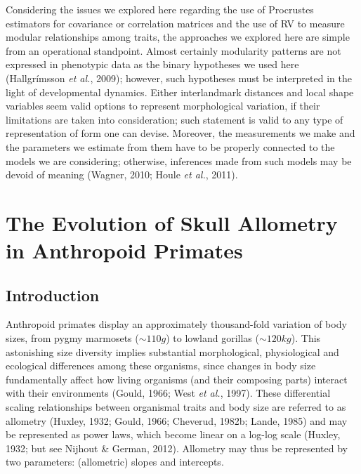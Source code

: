 \documentclass[12pt,twoside]{report}
\begin{document}
Considering the issues we explored here regarding the use of Procrustes
estimators for covariance or correlation matrices and the use of RV to
measure modular relationships among traits, the approaches we explored
here are simple from an operational standpoint. Almost certainly
modularity patterns are not expressed in phenotypic data as the binary
hypotheses we used here (Hallgrímsson \emph{et al.}, 2009); however,
such hypotheses must be interpreted in the light of developmental
dynamics. Either interlandmark distances and local shape variables seem
valid options to represent morphological variation, if their limitations
are taken into consideration; such statement is valid to any type of
representation of form one can devise. Moreover, the measurements we
make and the parameters we estimate from them have to be properly
connected to the models we are considering; otherwise, inferences made
from such models may be devoid of meaning (Wagner, 2010; Houle \emph{et
al.}, 2011).

\newpage
\chapter{The Evolution of Skull Allometry in Anthropoid Primates}
\label{ch:allo}

\section{Introduction}\label{introduction-1}

Anthropoid primates display an approximately thousand-fold variation of
body sizes, from pygmy marmosets ($\sim 110g$) to lowland gorillas
($\sim 120kg$). This astonishing size diversity implies substantial
morphological, physiological and ecological differences among these
organisms, since changes in body size fundamentally affect how living
organisms (and their composing parts) interact with their environments
(Gould, 1966; West \emph{et al.}, 1997). These differential scaling
relationships between organismal traits and body size are referred to as
allometry (Huxley, 1932; Gould, 1966; Cheverud, 1982b; Lande, 1985) and
may be represented as power laws, which become linear on a log-log scale
(Huxley, 1932; but see Nijhout \& German, 2012). Allometry may thus be
represented by two parameters: (allometric) slopes and intercepts.
\end{document}
